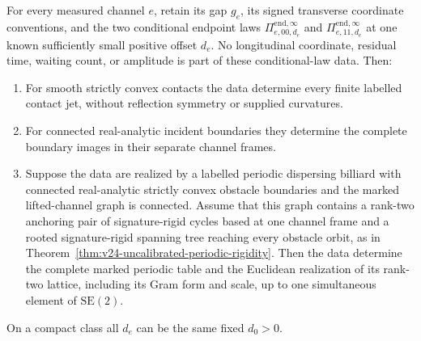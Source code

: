 \begin{theorem}
\label{thm:v26-single-offset-global}
For every measured channel \(e\), retain its gap \(g_e\), its signed
transverse coordinate conventions, and the two conditional endpoint laws
\(\Pi^{\mathrm{end},\infty}_{e,00,d_e}\) and
\(\Pi^{\mathrm{end},\infty}_{e,11,d_e}\) at one known sufficiently small
positive offset \(d_e\).  No longitudinal coordinate, residual time, waiting
count, or amplitude is part of these conditional-law data.  Then:

\begin{enumerate}
\item For smooth strictly convex contacts the data determine every finite
labelled contact jet, without reflection symmetry or supplied curvatures.
\item For connected real-analytic incident boundaries they determine the
complete boundary images in their separate channel frames.
\item Suppose the data are realized by a labelled periodic dispersing
billiard with connected real-analytic strictly convex obstacle boundaries
and the marked lifted-channel graph is connected.  Assume that this graph
contains a rank-two anchoring pair of signature-rigid cycles based at one
channel frame and a rooted signature-rigid spanning tree reaching every
obstacle orbit, as in
Theorem~\ref{thm:v24-uncalibrated-periodic-rigidity}.  Then the data determine
the complete marked periodic table and the Euclidean realization of its
rank-two lattice, including its Gram form and scale, up to one simultaneous
element of \(\mathrm{SE}(2)\).
\end{enumerate}
On a compact class all \(d_e\) can be the same fixed \(d_0>0\).
\end{theorem}

